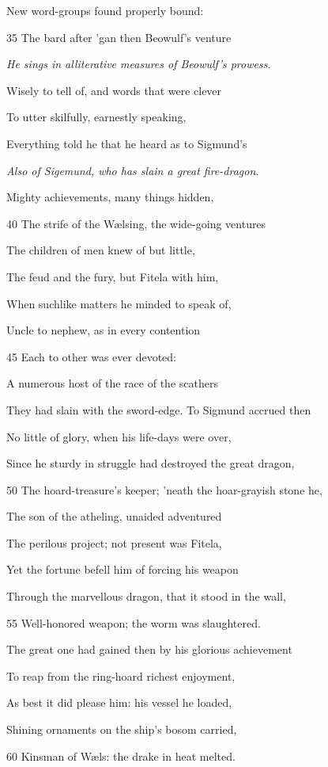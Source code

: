 New word-groups found properly bound:

35
The bard after ’gan then Beowulf’s venture

\emph{He sings in alliterative
measures of
Beowulf’s prowess.}

Wisely to tell of, and words that were clever

To utter skilfully, earnestly speaking,

Everything told he that he heard as to Sigmund’s

\emph{Also of Sigemund,
who has slain a
great fire-dragon.}

Mighty achievements, many things hidden,

40
The strife of the Wælsing, the wide-going ventures

The children of men knew of but little,

The feud and the fury, but Fitela with him,

When suchlike matters he minded to speak of,

Uncle to nephew, as in every contention

45
Each to other was ever devoted:

A numerous host of the race of the scathers

They had slain with the sword-edge. To Sigmund accrued then

No little of glory, when his life-days were over,

Since he sturdy in struggle had destroyed the great dragon,

50
The hoard-treasure’s keeper; ’neath the hoar-grayish stone he,

The son of the atheling, unaided adventured

The perilous project; not present was Fitela,

Yet the fortune befell him of forcing his weapon

Through the marvellous dragon, that it stood in the wall,

55
Well-honored weapon; the worm was slaughtered.

The great one had gained then by his glorious achievement

To reap from the ring-hoard richest enjoyment,

As best it did please him: his vessel he loaded,

Shining ornaments on the ship’s bosom carried,

60
Kinsman of Wæls: the drake in heat melted.

